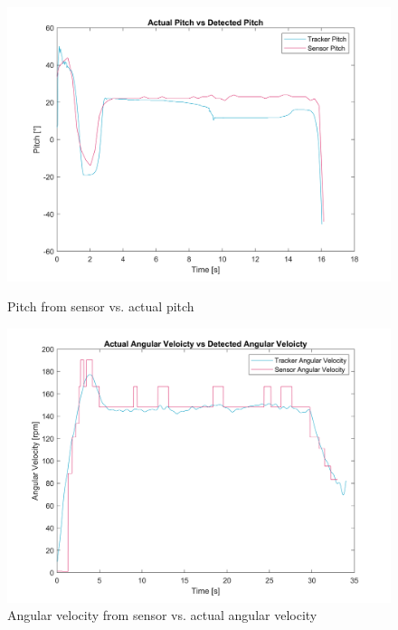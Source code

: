         \begin{figure}[h]
            \centering
            \begin{minipage}{0.45\textwidth}
                \centering
                \includegraphics*[width =\textwidth]{figs/Data_Analysis/Pitch Graph-Tip Thrust-Experiment-2024-10-07_17-54-35.png}
                \caption{Pitch from sensor vs. actual pitch}
                \label{fig: compared_pitch}
            \end{minipage}\hfill
            \begin{minipage}{0.45\textwidth}
                \centering
                \includegraphics*[width =\textwidth]{figs/Data_Analysis/Pitch Graph-Speed Test.png}
                \caption{Angular velocity from sensor vs. actual angular velocity} 
                \label{fig: compared_speed}
            \end{minipage}
        \end{figure} 
      
